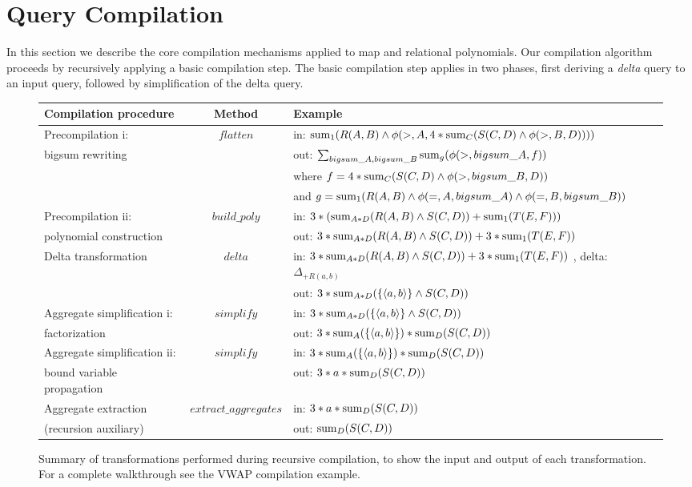 \section{Query Compilation}
In this section we describe the core compilation mechanisms applied to map and
relational polynomials. Our compilation algorithm proceeds by recursively
applying a basic compilation step. The basic compilation step applies in two
phases, first deriving a \textit{delta} query to an input query, followed by
simplification of the delta query. 

\begin{figure}[htbp]
\begin{center}
\begin{tabular}{|l|c|l|}
\hline
Compilation procedure & Method & Example \\
\hline Precompilation i:            & $flatten$
& in: $\mathrm{sum}_{1}(R(A,B) \wedge \phi(>,A,4*
           \mathrm{sum}_{C}(S(C,D) \wedge \phi(>,B,D))))$
\\
bigsum rewriting & & out: $\sum_{bigsum\_A, bigsum\_B}{\mathrm{sum}_{g} (\phi(>,bigsum\_A, f))}$
\\
& & where $f = 4* \mathrm{sum}_{C}(S(C,D) \wedge \phi(>,bigsum\_B,D))$
\\
& & and $g = \mathrm{sum}_{1}(R(A,B) \wedge \phi(=,A,bigsum\_A)
           \wedge \phi(=,B,bigsum\_B))$
\\
\hline Precompilation ii:  & $build\_poly$
& in: $3 * (\mathrm{sum}_{A*D}(R(A,B) \wedge S(C,D)) + \mathrm{sum}_{1}(T(E,F)))$
\\
polynomial construction &
& out: $3*\mathrm{sum}_{A*D}(R(A,B) \wedge S(C,D)) + 3*\mathrm{sum}_{1}(T(E,F))$
\\
\hline Delta transformation        & $delta$
& in:
    $ 3*\mathrm{sum}_{A*D}(R(A,B) \wedge S(C,D)) +
     3*\mathrm{sum}_{1}(T(E,F))$
, delta: $\Delta_{+R(a,b)}$
\\
& & out:
    $3*\mathrm{sum}_{A*D}(\{{\langle a,b\rangle}\} \wedge S(C,D))$
\\
\hline Aggregate simplification i:  & $simplify$
& in: $3*\mathrm{sum}_{A*D}(\{{\langle a,b\rangle}\} \wedge S(C,D))$
\\
factorization & & out:
    $3*\mathrm{sum}_{A}(\{{\langle a,b\rangle}\})*\mathrm{sum}_{D}(S(C,D))$
\\
\hline Aggregate simplification ii: & $simplify$
& in: $3*\mathrm{sum}_{A}(\{{\langle a,b\rangle}\})*\mathrm{sum}_{D}(S(C,D))$
\\
bound variable propagation & & out:
    $3*a*\mathrm{sum}_{D}(S(C,D))$
\\
\hline Aggregate extraction        & $extract\_aggregates$
& in: $3*a*\mathrm{sum}_{D}(S(C,D))$
\\
(recursion auxiliary) & & out: $\mathrm{sum}_{D}(S(C,D))$
\\
\hline
\end{tabular}
\vspace{-3mm}
\caption{Summary of transformations performed during recursive compilation, to
show the input and output of each transformation. For a complete walkthrough see
the VWAP compilation example.}
\label{fig:methodsummary}
\end{center}
\end{figure}


